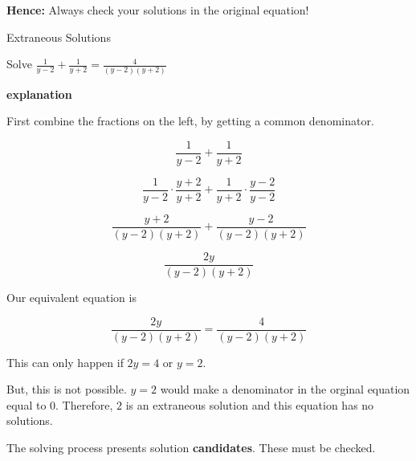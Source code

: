 \documentclass{ximera}
\begin{document}
\textbf{Hence:} Always check your solutions in the original equation!







\begin{example} Extraneous Solutions


Solve $\frac{1}{y-2} + \frac{1}{y+2} = \frac{4}{(y-2)(y+2)}$


\textbf{\textcolor{red!75!green}{explanation}} 



First combine the fractions on the left, by getting a common denominator.



\[    \frac{1}{y-2} + \frac{1}{y+2}        \]

\[    \frac{1}{y-2} \cdot \frac{y+2}{y+2} + \frac{1}{y+2}  \cdot \frac{y-2}{y-2}       \]

\[    \frac{y+2}{(y-2)(y+2)} + \frac{y-2}{(y-2)(y+2)}      \]

\[    \frac{2y}{(y-2)(y+2)}     \]

Our equivalent equation is


\[    \frac{2y}{(y-2)(y+2)}   = \frac{4}{(y-2)(y+2)}   \]


This can only happen if $2y = 4$ or $y = 2$.

But, this is not possible.  $y=2$ would make a denominator in the orginal equation equal to $0$.  Therefore, $2$ is an extraneous solution and this equation has no solutions.



\end{example}



The solving process presents solution \textbf{candidates}.  These must be checked.
\end{document}
